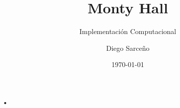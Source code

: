 \documentclass[11pt]{beamer}
\author{Diego Sarceño}
\title{Monty Hall}
\subtitle{Implementación Computacional}
\institute{Universidad de San Carlos de Guatemala}
\date{\today}
\begin{document}
\begin{frame}
\titlepage
\end{frame}


\begin{frame}{•}

\end{frame}
\end{document}
